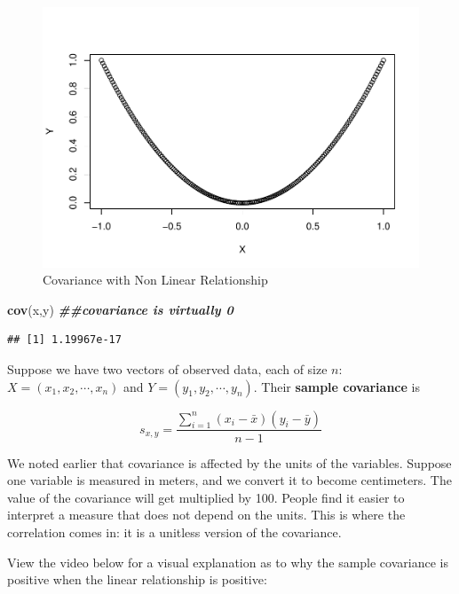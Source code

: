 \documentclass[
]{book}
\newenvironment{Shaded}{\begin{snugshade}}{\end{snugshade}}
\newcommand{\DocumentationTok}[1]{\textcolor[rgb]{0.56,0.35,0.01}{\textbf{\textit{#1}}}}
\newcommand{\FunctionTok}[1]{\textcolor[rgb]{0.13,0.29,0.53}{\textbf{#1}}}
\newcommand{\NormalTok}[1]{#1}
\begin{document}
\begin{figure}
\centering
\includegraphics{bookdown-demo_files/figure-latex/5-cov0-1.pdf}
\caption{\label{fig:5-cov0}Covariance with Non Linear Relationship}
\end{figure}

\begin{Shaded}
\begin{Highlighting}[]
\FunctionTok{cov}\NormalTok{(x,y) }\DocumentationTok{\#\#covariance is virtually 0}
\end{Highlighting}
\end{Shaded}

\begin{verbatim}
## [1] 1.19967e-17
\end{verbatim}

Suppose we have two vectors of observed data, each of size \(n\): \(X = (x_1, x_2, \cdots, x_n)\) and \(Y = (y_1, y_2, \cdots, y_n)\). Their \textbf{sample covariance} is

\begin{equation} 
s_{x,y} = \frac{\sum_{i=1}^n (x_i - \bar{x})(y_i - \bar{y})}{n-1}
\label{eq:5-sampcov}
\end{equation}

We noted earlier that covariance is affected by the units of the variables. Suppose one variable is measured in meters, and we convert it to become centimeters. The value of the covariance will get multiplied by 100. People find it easier to interpret a measure that does not depend on the units. This is where the correlation comes in: it is a unitless version of the covariance.

View the video below for a visual explanation as to why the sample covariance is positive when the linear relationship is positive:
\end{document}
